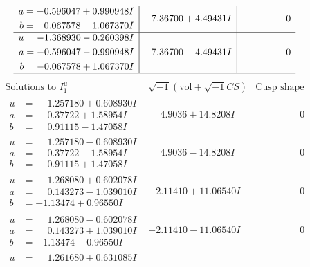 \documentclass[1p]{elsarticle_modified}
\theoremstyle{definition}
\newcommand{\I}{\sqrt{-1}}
\begin{document}
$$\begin{array}{c|c|c}
\begin{aligned}
a &= -0.596047 + 0.990948 I \\
b &= -0.067578 - 1.067370 I\end{aligned}
 & \phantom{-}7.36700 + 4.49431 I & \phantom{-0.000000 } 0 \\ \hline\begin{aligned}
u &= -1.368930 - 0.260398 I \\
a &= -0.596047 - 0.990948 I \\
b &= -0.067578 + 1.067370 I\end{aligned}
 & \phantom{-}7.36700 - 4.49431 I & \phantom{-0.000000 } 0\\
 \hline 
 \end{array}$$\newpage$$\begin{array}{c|c|c}  
\text{Solutions to }I^u_{1}& \I (\text{vol} + \sqrt{-1}CS) & \text{Cusp shape}\\
 \hline 
\begin{aligned}
u &= \phantom{-}1.257180 + 0.608930 I \\
a &= \phantom{-}0.37722 + 1.58954 I \\
b &= \phantom{-}0.91115 - 1.47058 I\end{aligned}
 & \phantom{-}4.9036 + 14.8208 I & \phantom{-0.000000 } 0 \\ \hline\begin{aligned}
u &= \phantom{-}1.257180 - 0.608930 I \\
a &= \phantom{-}0.37722 - 1.58954 I \\
b &= \phantom{-}0.91115 + 1.47058 I\end{aligned}
 & \phantom{-}4.9036 - 14.8208 I & \phantom{-0.000000 } 0 \\ \hline\begin{aligned}
u &= \phantom{-}1.268080 + 0.602078 I \\
a &= \phantom{-}0.143273 - 1.039010 I \\
b &= -1.13474 + 0.96550 I\end{aligned}
 & -2.11410 + 11.06540 I & \phantom{-0.000000 } 0 \\ \hline\begin{aligned}
u &= \phantom{-}1.268080 - 0.602078 I \\
a &= \phantom{-}0.143273 + 1.039010 I \\
b &= -1.13474 - 0.96550 I\end{aligned}
 & -2.11410 - 11.06540 I & \phantom{-0.000000 } 0 \\ \hline\begin{aligned}
u &= \phantom{-}1.261680 + 0.631085 I \\

\end{aligned}
\end{array}$$
\end{document}
